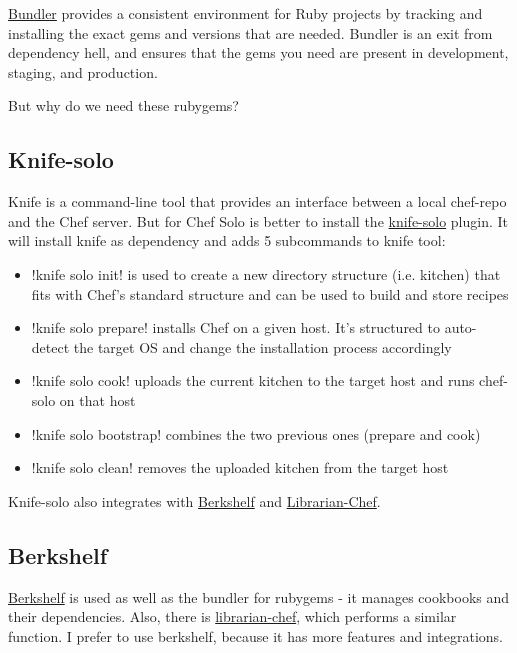 \href{http://bundler.io/}{Bundler} provides a consistent environment for Ruby projects by tracking and installing the exact gems and versions that are needed. Bundler is an exit from dependency hell, and ensures that the gems you need are present in development, staging, and production.

But why do we need these rubygems?

\subsection{Knife-solo}

Knife is a command-line tool that provides an interface between a local chef-repo and the Chef server. But for Chef Solo is better to install the \href{http://matschaffer.github.io/knife-solo/}{knife-solo} plugin. It will install knife as dependency and adds 5 subcommands to knife tool:

\begin{itemize}
  \item \inline!knife solo init! is used to create a new directory structure (i.e. kitchen) that fits with Chef's standard structure and can be used to build and store recipes
  \item \inline!knife solo prepare! installs Chef on a given host. It's structured to auto-detect the target OS and change the installation process accordingly
  \item \inline!knife solo cook! uploads the current kitchen to the target host and runs chef-solo on that host
  \item \inline!knife solo bootstrap! combines the two previous ones (prepare and cook)
  \item \inline!knife solo clean! removes the uploaded kitchen from the target host
\end{itemize}

Knife-solo also integrates with \href{http://berkshelf.com/}{Berkshelf} and \href{https://github.com/applicationsonline/librarian-chef}{Librarian-Chef}.

\subsection{Berkshelf}

\href{http://berkshelf.com/}{Berkshelf} is used as well as the bundler for rubygems - it manages cookbooks and their dependencies. Also, there is \href{https://github.com/applicationsonline/librarian-chef}{librarian-chef}, which performs a similar function. I prefer to use berkshelf, because it has more features and integrations.
